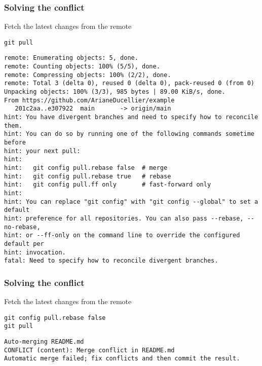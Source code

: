 \documentclass{beamer}
\begin{document}
	\begin{frame}[fragile]
		\frametitle{Solving the conflict}
		
		Fetch the latest changes from the remote

		\begin{exampleblock}{}
		\begin{BVerbatim}
git pull
		\end{BVerbatim}
		\end{exampleblock}{}

		\begin{exampleblock}{}
		\begin{tiny}
		\begin{BVerbatim}
remote: Enumerating objects: 5, done.
remote: Counting objects: 100%
remote: Compressing objects: 100%
remote: Total 3 (delta 0), reused 0 (delta 0), pack-reused 0 (from 0)
Unpacking objects: 100%
From https://github.com/ArianeDucellier/example
   201c2aa..e307922  main       -> origin/main
hint: You have divergent branches and need to specify how to reconcile them.
hint: You can do so by running one of the following commands sometime before
hint: your next pull:
hint: 
hint:   git config pull.rebase false  # merge
hint:   git config pull.rebase true   # rebase
hint:   git config pull.ff only       # fast-forward only
hint: 
hint: You can replace "git config" with "git config --global" to set a default
hint: preference for all repositories. You can also pass --rebase, --no-rebase,
hint: or --ff-only on the command line to override the configured default per
hint: invocation.
fatal: Need to specify how to reconcile divergent branches.
		\end{BVerbatim}
		\end{tiny}
		\end{exampleblock}{}		
	\end{frame}

	\begin{frame}[fragile]
		\frametitle{Solving the conflict}
		
		Fetch the latest changes from the remote

		\begin{exampleblock}{}
		\begin{BVerbatim}
git config pull.rebase false
git pull
		\end{BVerbatim}
		\end{exampleblock}{}

		\begin{exampleblock}{}
		\begin{tiny}
		\begin{BVerbatim}
Auto-merging README.md
CONFLICT (content): Merge conflict in README.md
Automatic merge failed; fix conflicts and then commit the result.
		\end{BVerbatim}
		\end{tiny}
		\end{exampleblock}{}
	\end{frame}
\end{document}

